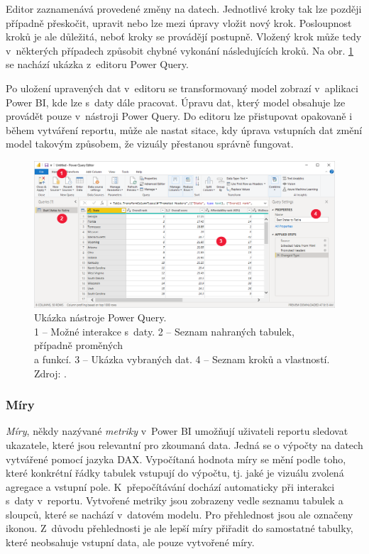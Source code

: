 Editor zaznamenává provedené změny na datech. Jednotlivé kroky tak lze později případně přeskočit, upravit  nebo lze mezi úpravy vložit nový krok. Posloupnost kroků je ale důležitá, neboť kroky se provádějí postupně. Vložený krok může tedy v~některých případech způsobit chybné vykonání následujících kroků. Na obr. \ref*{obr:PBI:PQ} se nachází ukázka z~editoru Power Query.

Po uložení upravených dat v~editoru se transformovaný model zobrazí v~aplikaci Power BI, kde lze s~daty dále pracovat. Úpravu dat, který model obsahuje lze provádět pouze v~nástroji Power Query. Do editoru lze přistupovat opakovaně i během vytváření reportu, může ale nastat sitace, kdy úprava vstupních dat změní model takovým způsobem, že vizuály přestanou správně fungovat.

\begin{figure}[h!]
    \centering
    \captionsetup{justification=centering}
    \includegraphics[width=\textwidth]{obrazky/PBIteorie/query-overview-with-data-connection.png}
    \caption{Ukázka nástroje Power Query. \\1 -- Možné interakce s~daty. 2 -- Seznam nahraných tabulek, případně proměných \\a funkcí. 3 -- Ukázka vybraných dat. 4 -- Seznam kroků a vlastností. 
    Zdroj: \cite{bib:PBI}.}
    \label{obr:PBI:PQ}
\end{figure}

\subsubsection*{Míry}

\emph{Míry}, někdy nazývané \emph{metriky} v~Power BI umožňují uživateli reportu sledovat ukazatele, které jsou relevantní pro zkoumaná data. Jedná se o výpočty na datech vytvářené pomocí jazyka DAX. Vypočítaná hodnota míry se mění podle toho, které konkrétní řádky tabulek vstupují do výpočtu, tj. jaké je vizuálu zvolená agregace a vstupní pole. K~přepočítávání dochází automaticky při interakci s~daty v~reportu. Vytvořené metriky jsou zobrazeny vedle seznamu tabulek a sloupců, které se nachází v~datovém modelu. Pro přehlednost jsou ale označeny ikonou. Z~důvodu přehlednosti je ale lepší míry přiřadit do samostatné tabulky, které neobsahuje vstupní data, ale pouze vytvořené míry.

